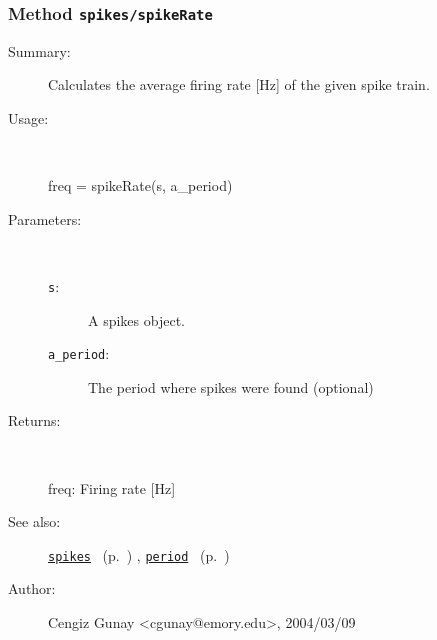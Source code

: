\subsubsection[Method \texttt{spikeRate}]{Method \texttt{spikes/spikeRate}}%
%
\label{ref_spikes__spikeRate}%
\hypertarget{ref_spikes__spikeRate}{}%
\begin{description}
\item[Summary:]Calculates the average firing rate [Hz] of the given spike train.
%
\item[Usage:]~%
\begin{lyxcode}%
freq = spikeRate(s, a\_period)
%
\end{lyxcode}%
%
%
\item[Parameters:]~
\begin{description}%
\item[\texttt{s}:]
 A spikes object.
\item[\texttt{a\_period}:]
 The period where spikes were found (optional)
\end{description}%
%
\item[Returns:
]~

	freq: Firing rate [Hz]
%
%
\item[See also:]%
\hyperlink{ref_spikes}{\texttt{spikes}}%
\ (p.~\pageref{ref_spikes})%
%
, \hyperlink{ref_period}{\texttt{period}}%
\ (p.~\pageref{ref_period})%
%
%
\item[Author:]%
Cengiz Gunay <cgunay@emory.edu>, 2004/03/09
%
\end{description}
\methodline%
